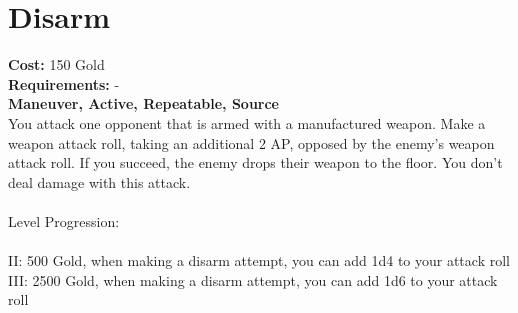 \section*{Disarm}
\textbf{Cost:} 150 Gold\\
\textbf{Requirements:} -\\
\textbf{Maneuver, Active, Repeatable, Source}\\
You attack one opponent that is armed with a manufactured weapon. Make a weapon attack roll, taking an additional 2 AP, opposed by the enemy's weapon attack roll. If you succeed, the enemy drops their weapon to the floor. You don't deal damage with this attack.\\
\\
Level Progression:\\
\\
II: 500 Gold, when making a disarm attempt, you can add 1d4 to your attack roll\\ 
III: 2500 Gold, when making a disarm attempt, you can add 1d6 to your attack roll\\